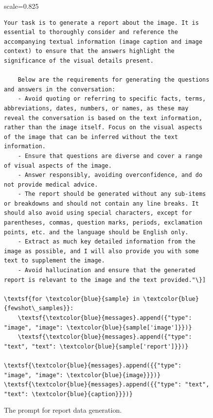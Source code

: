 \begin{figure}[t]
\begin{minipage}{1\linewidth}
\begin{adjustbox}{scale=0.825}
\begin{minipage}{1.2\columnwidth}
\begin{Verbatim}[frame=single, numbersep=5pt,
                     commandchars=\\\{\}, breaklines=true,  
                     breaksymbolleft={}, breaksymbolright={}]
    Your task is to generate a report about the image. It is essential to thoroughly consider and reference the accompanying textual information (image caption and image context) to ensure that the answers highlight the significance of the visual details present.

    Below are the requirements for generating the questions and answers in the conversation:
    - Avoid quoting or referring to specific facts, terms, abbreviations, dates, numbers, or names, as these may reveal the conversation is based on the text information, rather than the image itself. Focus on the visual aspects of the image that can be inferred without the text information.
    - Ensure that questions are diverse and cover a range of visual aspects of the image.
    - Answer responsibly, avoiding overconfidence, and do not provide medical advice.
    - The report should be generated without any sub-items or breakdowns and should not contain any line breaks. It should also avoid using special characters, except for parentheses, commas, question marks, periods, exclamation points, etc. and the language should be English only.  
    - Extract as much key detailed information from the image as possible, and I will also provide you with some text to supplement the image.
    - Avoid hallucination and ensure that the generated report is relevant to the image and the text provided."\}]

\textsf{for \textcolor{blue}{sample} in \textcolor{blue}{fewshot\_samples}}:
    \textsf{\textcolor{blue}{messages}.append({"type": "image", "image": \textcolor{blue}{sample['image']}})}
    \textsf{\textcolor{blue}{messages}.append({"type": "text", "text": \textcolor{blue}{sample['report']}})}

\textsf{\textcolor{blue}{messages}.append({{"type": "image", "image": \textcolor{blue}{image}}})}
\textsf{\textcolor{blue}{messages}.append({{"type": "text", "text": \textcolor{blue}{caption}}})}
    \end{Verbatim}
    \end{minipage}
    \end{adjustbox}
    \centering
    \vspace{-6pt}
    \caption{The prompt for report data generation.}
    \label{figB}
\end{minipage}
\end{figure}


